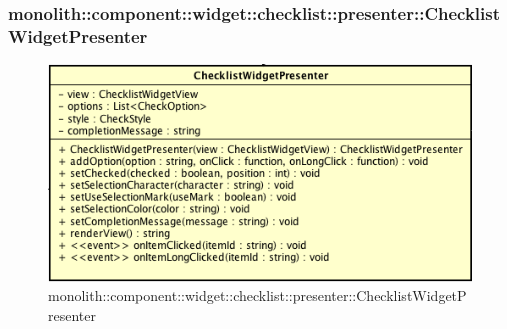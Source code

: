 \subsubsection{monolith::component::widget::checklist::presenter::ChecklistWidgetPresenter}

\label{monolith::component::widget::checklist::presenter::ChecklistWidgetPresenter}
\begin{figure}[H]
	\centering
	\includegraphics[scale=0.5]{Sezioni/SottosezioniST/img/ChecklistWidgetPresenter.png}
	\caption{monolith::component::widget::checklist::presenter::ChecklistWidgetPresenter}
\end{figure}

